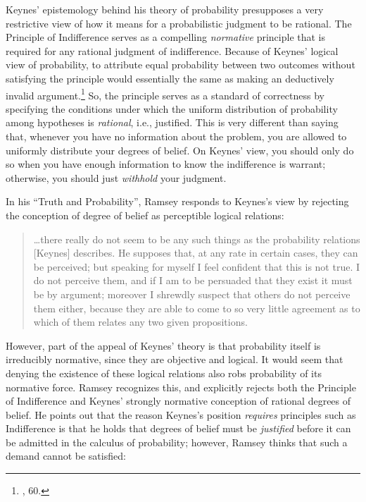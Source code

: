 Keynes' epistemology behind his theory of probability presupposes a very restrictive view of how it means for a probabilistic judgment to be rational.  The Principle of Indifference serves as a compelling \emph{normative} principle that is required for any rational judgment of indifference. Because of Keynes' logical view of probability, to attribute equal probability between two outcomes without satisfying the principle would essentially the same as making an deductively invalid argument.\footnote{\cite{keynes}, 60.}
So, the principle serves as a standard of correctness by specifying the conditions under which the uniform distribution of probability among hypotheses is \emph{rational}, i.e., justified. This is very different than saying that, whenever you have no information about the problem, you are allowed to uniformly distribute your degrees of belief. On Keynes' view, you should only do so when you have enough information to know the indifference is warrant; otherwise, you should just \emph{withhold} your judgment.

In his ``Truth and Probability'', Ramsey responds to Keynes's view by
rejecting the conception of degree of belief as perceptible logical
relations:

\begin{quote}
\ldots{}there really do not seem to be any such things as the
probability relations {[}Keynes{]} describes. He supposes that, at any
rate in certain cases, they can be perceived; but speaking for myself I
feel confident that this is not true. I do not perceive them, and if I
am to be persuaded that they exist it must be by argument; moreover I
shrewdly suspect that others do not perceive them either, because they
are able to come to so very little agreement as to which of them relates
any two given propositions.
\end{quote}

However, part of the appeal of Keynes' theory is that probability itself
is irreducibly normative, since they are objective and logical. It would seem that denying the existence of these logical relations also robs probability of its normative force. Ramsey recognizes this, and explicitly rejects both the Principle of Indifference and Keynes' strongly normative conception of rational degrees of belief. He points out that the reason Keynes's position
\emph{requires} principles such as Indifference is that he holds that
degrees of belief must be \emph{justified} before it can be admitted in
the calculus of probability; however, Ramsey thinks that such a demand
cannot be satisfied:

